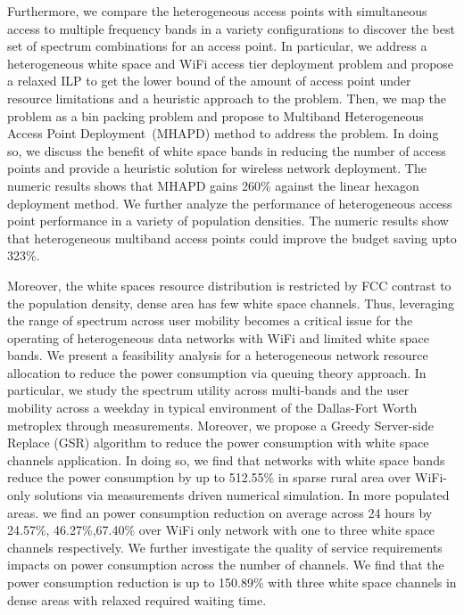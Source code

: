 Furthermore, we compare the heterogeneous access points with simultaneous access to 
multiple frequency bands in a variety configurations to discover the best set of 
spectrum combinations for an access point. In particular, we address a heterogeneous white space and 
WiFi access tier deployment problem and propose a relaxed ILP to get the lower 
bound of the amount of access point under resource limitations and a heuristic 
approach to the problem. Then, we map the problem as a bin packing problem and 
propose to Multiband Heterogeneous Access Point Deployment~(MHAPD) method to address
the problem. In doing so, we discuss the benefit of white space bands 
in reducing the number of access points and provide a heuristic solution for 
wireless network deployment. The numeric results shows that MHAPD gains 260\% 
against the linear hexagon deployment method.  We further analyze the performance 
of heterogeneous access point performance in a variety of population densities. 
The numeric results show that heterogeneous multiband access points could improve the budget 
saving upto 323\%. 

Moreover, the white spaces resource distribution is restricted by FCC contrast to the population density, 
dense area has few white space channels.
Thus, leveraging the range of spectrum across user mobility becomes a critical issue for the operating of 
heterogeneous data networks with WiFi and limited white space bands. 
We present a feasibility analysis for a heterogeneous network resource allocation to reduce 
the power consumption via queuing theory approach.
In particular, we study the spectrum utility across multi-bands and the user mobility across a weekday in 
typical environment of the Dallas-Fort Worth metroplex through measurements. 
Moreover, we propose a Greedy Server-side Replace (GSR) algorithm to reduce the power consumption with 
white space channels application. 
In doing so, we find that networks with white space bands reduce the power consumption by up to 512.55\% in sparse 
rural area over WiFi-only solutions via measurements driven numerical simulation. In more populated areas. we find 
an power consumption reduction on average across 24 hours by 24.57\%, 46.27\%,67.40\% over WiFi only network with 
one to three white space channels respectively.
We further investigate the quality of service requirements impacts on power consumption across the number of channels.
We find that the power consumption reduction is up to 150.89\% with three white space channels in dense areas with 
relaxed required waiting time.



